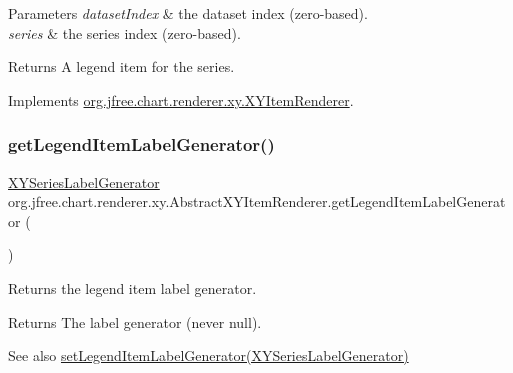 \begin{DoxyParams}{Parameters}
{\em dataset\+Index} & the dataset index (zero-\/based). \\
\hline
{\em series} & the series index (zero-\/based).\\
\hline
\end{DoxyParams}
\begin{DoxyReturn}{Returns}
A legend item for the series. 
\end{DoxyReturn}


Implements \mbox{\hyperlink{interfaceorg_1_1jfree_1_1chart_1_1renderer_1_1xy_1_1_x_y_item_renderer_a792c3e8c39bf57711528cd8064d2ddb5}{org.\+jfree.\+chart.\+renderer.\+xy.\+X\+Y\+Item\+Renderer}}.

\mbox{\label{classorg_1_1jfree_1_1chart_1_1renderer_1_1xy_1_1_abstract_x_y_item_renderer_adb671043619b9b91070ddb7c8554618a}} 
\subsubsection{\texorpdfstring{get\+Legend\+Item\+Label\+Generator()}{getLegendItemLabelGenerator()}}
{\footnotesize\ttfamily \mbox{\hyperlink{interfaceorg_1_1jfree_1_1chart_1_1labels_1_1_x_y_series_label_generator}{X\+Y\+Series\+Label\+Generator}} org.\+jfree.\+chart.\+renderer.\+xy.\+Abstract\+X\+Y\+Item\+Renderer.\+get\+Legend\+Item\+Label\+Generator (\begin{DoxyParamCaption}{ }\end{DoxyParamCaption})}

Returns the legend item label generator.

\begin{DoxyReturn}{Returns}
The label generator (never {\ttfamily null}).
\end{DoxyReturn}
\begin{DoxySeeAlso}{See also}
\mbox{\hyperlink{classorg_1_1jfree_1_1chart_1_1renderer_1_1xy_1_1_abstract_x_y_item_renderer_a97f408b8a3a32497f042a33ae4da36a2}{set\+Legend\+Item\+Label\+Generator(\+X\+Y\+Series\+Label\+Generator)}} 
\end{DoxySeeAlso}



